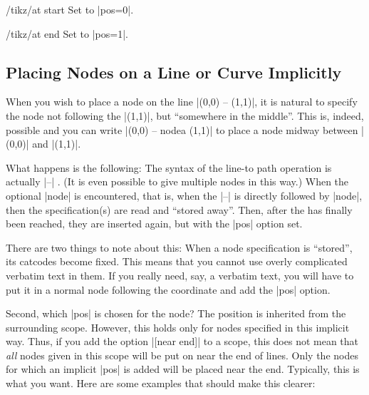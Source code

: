 \begin{stylekey}{/tikz/at start}
    Set to |pos=0|.
\end{stylekey}

\begin{stylekey}{/tikz/at end}
    Set to |pos=1|.
\end{stylekey}


\subsection{Placing Nodes on a Line or Curve Implicitly}
\label{section-nodes-placing-2}

When you wish to place a node on the line |(0,0) -- (1,1)|, it is natural to
specify the node not following the |(1,1)|, but ``somewhere in the middle''.
This is, indeed, possible and you can write |(0,0) -- node{a} (1,1)| to place a
node midway between |(0,0)| and |(1,1)|.

What happens is the following: The syntax of the line-to path operation is
actually |--| . (It is
even possible to give multiple nodes in this way.) When the optional |node| is
encountered, that is, when the |--| is directly followed by |node|, then the
specification(s) are read and ``stored away''. Then, after the
 has finally been reached, they are inserted again, but with
the |pos| option set.

There are two things to note about this: When a node specification is
``stored'', its catcodes become fixed. This means that you cannot use overly
complicated verbatim text in them. If you really need, say, a verbatim text,
you will have to put it in a normal node following the coordinate and add the
|pos| option.

Second, which |pos| is chosen for the node? The position is inherited from the
surrounding scope. However, this holds only for nodes specified in this
implicit way. Thus, if you add the option |[near end]| to a scope, this does
not mean that \emph{all} nodes given in this scope will be put on near the end
of lines. Only the nodes for which an implicit |pos| is added will be placed
near the end. Typically, this is what you want. Here are some examples that
should make this clearer:
%
\begin{codeexample}[]
\end{codeexample}

